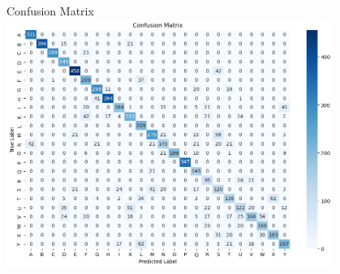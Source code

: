 \documentclass{beamer}
\begin{document}
\begin{frame}{Confusion Matrix}
    \centering
    \includegraphics[width=0.8\textwidth]{confusion.png}
\end{frame}
\end{document}
